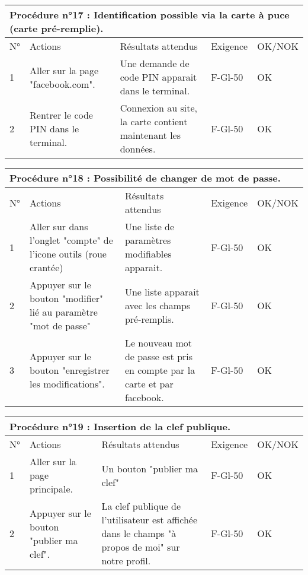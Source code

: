 \documentclass[a4paper,11pt,french]{article}
\begin{document}
\vspace{1cm}
\hspace{-1cm}
\begin{tabular}{|p{1cm}|p{5cm}|p{5cm}|p{2cm}|p{2cm}|}
\hline
\multicolumn{5}{|l|}{Procédure n°17 : Identification possible via la carte à puce (carte pré-remplie).} \\
\hline
N° & Actions & Résultats attendus & Exigence & OK/NOK \\
\hline
1 & Aller sur la page "facebook.com". & Une demande de code PIN apparait dans le terminal. & F-Gl-50 & OK \\
\hline
2 & Rentrer le code PIN dans le terminal. & Connexion au site, la carte contient maintenant les données. & F-Gl-50 & OK \\
\hline
\end{tabular}

\vspace{1cm}
\hspace{-1cm}
\begin{tabular}{|p{1cm}|p{5cm}|p{5cm}|p{2cm}|p{2cm}|}
\hline
\multicolumn{5}{|l|}{Procédure n°18 : Possibilité de changer de mot de passe.} \\
\hline
N° & Actions & Résultats attendus & Exigence & OK/NOK \\
\hline
1 & Aller sur dans l'onglet "compte" de l'icone outils (roue crantée) & Une liste de paramètres modifiables apparait. & F-Gl-50 & OK \\
\hline
2 & Appuyer sur le bouton "modifier" lié au paramètre "mot de passe" & Une liste apparait avec les champs pré-remplis. & F-Gl-50 & OK \\
\hline
3 & Appuyer sur le bouton "enregistrer les modifications". & Le nouveau mot de passe est pris en compte par la carte et par facebook. & F-Gl-50 & OK \\
\hline
\end{tabular}

\vspace{1cm}
\hspace{-1cm}
\begin{tabular}{|p{1cm}|p{5cm}|p{5cm}|p{2cm}|p{2cm}|}
\hline
\multicolumn{5}{|l|}{Procédure n°19 : Insertion de la clef publique.} \\
\hline
N° & Actions & Résultats attendus & Exigence & OK/NOK \\
\hline
1 & Aller sur la page principale. & Un bouton "publier ma clef" & F-Gl-50 & OK \\
\hline
2 & Appuyer sur le bouton "publier ma clef". & La clef publique de l'utilisateur est affichée dans le champs "à propos de moi" sur notre profil. & F-Gl-50 & OK \\
\hline
\end{tabular}
\end{document}
